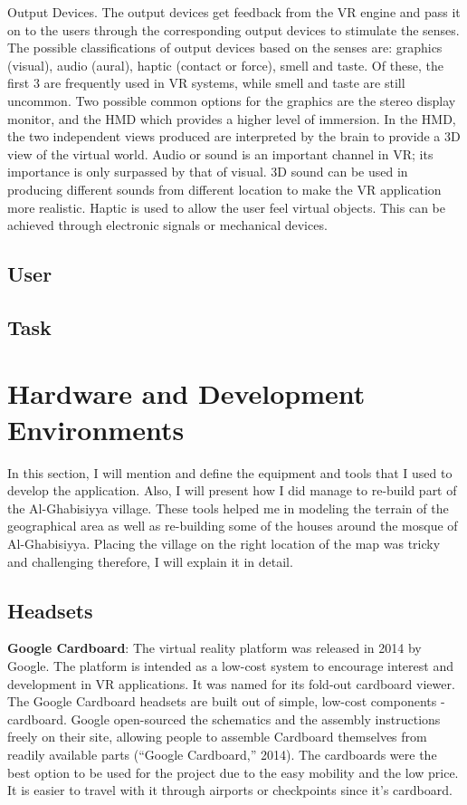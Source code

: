 Output Devices. The output devices get feedback from the VR engine and pass it on to the users through the corresponding output devices to stimulate the senses. The possible classifications of output devices based on the senses are: graphics (visual), audio (aural), haptic (contact or force), smell and taste. Of these, the first 3 are frequently used in VR systems, while smell and taste are still uncommon.
Two possible common options for the graphics are the stereo display monitor, and the HMD which provides a higher level of immersion. In the HMD, the two independent views produced are interpreted by the brain to provide a 3D view of the virtual world. Audio or sound is an important channel in VR; its importance is only surpassed by that of visual. 3D sound can be used in producing different sounds from different location to make the VR application more realistic.
Haptic is used to allow the user feel virtual objects. This can be achieved through electronic signals or mechanical devices.



\subsection{User}



\subsection{Task}



\section{Hardware and Development Environments}

In this section, I will mention and define the equipment and tools that I used to develop the application. Also, I will present how I did manage to re-build part of the Al-Ghabisiyya village. These tools helped me in modeling the terrain of the geographical area as well as re-building some of the houses around the mosque of Al-Ghabisiyya. Placing the village on the right location of the map was tricky and challenging therefore, I will explain it in detail. 
\subsection{Headsets}

\textbf{Google Cardboard}: The virtual reality platform was released in
2014 by Google. The platform is intended as a low-cost system to
encourage interest and development in VR applications. It was
named for its fold-out cardboard viewer. The Google Cardboard
headsets are built out of simple, low-cost components -
cardboard. Google open-sourced the schematics and the
assembly instructions freely on their site, allowing people to
assemble Cardboard themselves from readily available parts (“Google Cardboard,” 2014). The
cardboards were the best option to be used for the project due to the easy mobility and the
low price. It is easier to travel with it through airports or checkpoints since it’s cardboard.
